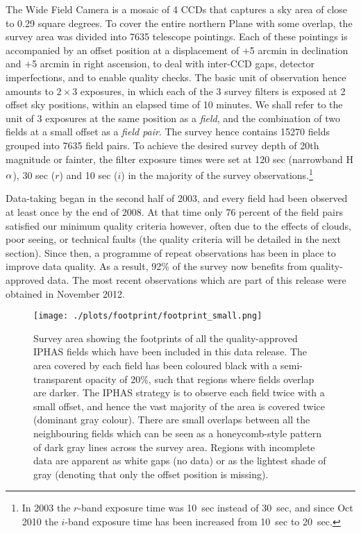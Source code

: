 \documentclass[useAMS,usenatbib]{mn2e}
\def\ha{\mbox{H$\rm \alpha$}}
\begin{document}
The Wide Field Camera is a mosaic of 4 CCDs 
that captures a sky area of close to 0.29 square degrees.
To cover the entire northern Plane with some overlap,
the survey area was divided into 7635 telescope pointings.
Each of these pointings is accompanied by an offset position
at a displacement of $+$5 arcmin in declination 
and $+$5 arcmin in right ascension,
to deal with inter-CCD gaps, detector imperfections,
and to enable quality checks. 
The basic unit of observation hence
amounts to $2 \times 3$ exposures, 
in which each of the 3 survey filters is exposed at 2 offset sky positions, 
within an elapsed time of 10 minutes.
We shall refer to the unit of 3 exposures at the same position 
as a \emph{field},
and the combination of two fields at a small offset as a \emph{field pair}.
The survey hence contains 15270 fields grouped into 7635 field pairs.
To achieve the desired survey depth of 20th magnitude or fainter, 
the filter exposure times were set at 120 sec (narrowband \ha), 
30 sec ($r$) and 10 sec ($i$)
in the majority of the survey observations.\footnote{In 2003 
the $r$-band exposure time was 10~sec instead of 30~sec,
and since Oct 2010 the $i$-band exposure time 
has been increased from 10~sec to 20~sec.}

Data-taking began in the second half of 2003, 
and every field had been observed at least once by the end of 2008.
At that time only 76 percent of the field pairs 
satisfied our minimum quality criteria however,  
often due to the effects of clouds, poor seeing, or technical faults
(the quality criteria will be detailed in the next section). 
Since then, a programme of repeat observations has been in place 
to improve data quality. 
As a result, 92\% of the survey 
now benefits from quality-approved data.
The most recent observations which are part of this release
were obtained in November 2012.

\begin{figure*}
        \texttt{[image: ./plots/footprint/footprint\_small.png]}
        \caption{Survey area showing the footprints
        of all the quality-approved IPHAS fields
        which have been included in this data release.
        The area covered by each field has been coloured black
        with a semi-transparent opacity of 20\%,
        such that regions where fields overlap are darker.
        The IPHAS strategy is to observe each field twice
        with a small offset,
        and hence the vast majority of the area 
        is covered twice (dominant gray colour).
        There are small overlaps between all the neighbouring fields
        which can be seen as a honeycomb-style pattern
        of dark gray lines across the survey area.
        Regions with incomplete data are apparent as white gaps (no data) 
        or as the lightest shade of gray
        (denoting that only the offset position is missing).}
        \label{fig:footprint}
\end{figure*}
\end{document}
